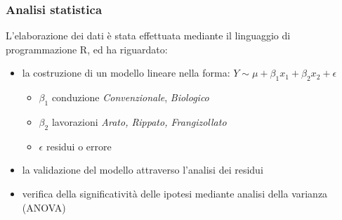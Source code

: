 \documentclass[10pt]{beamer}
\begin{document}
\begin{frame}
  \frametitle{Analisi statistica}
  L'elaborazione dei dati è stata effettuata mediante il linguaggio di
  programmazione R, ed ha riguardato:
  \begin{itemize}
    \item la costruzione di un modello lineare nella forma:
    \vspace{0.25cm}
    $Y \sim \mu + \beta_1x_1 + \beta_2x_2 + \epsilon$

    \begin{itemize}

      \item $\beta_1$ conduzione \newline
      \emph{Convenzionale}, \emph{Biologico}

      \item $\beta_2$ lavorazioni \newline \emph{Arato, Rippato,
        Frangizollato}

      \item$\epsilon$ residui o errore
    \end{itemize}
    \item la validazione del modello attraverso l'analisi
    dei residui 
    \item verifica della significatività delle ipotesi mediante analisi della varianza (ANOVA)
  \end{itemize}
\end{frame}
\end{document}
